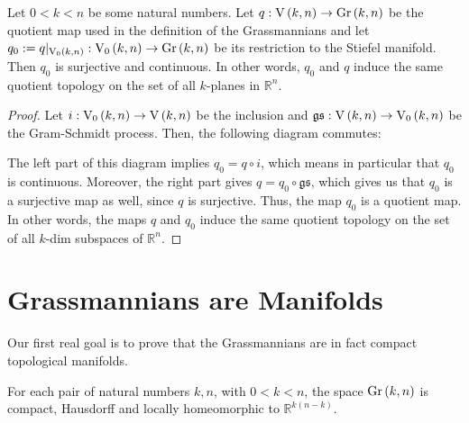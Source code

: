 \begin{proposition} Let $0<k<n$ be some natural numbers. Let $q:\St{k}{n}\to\Gr{k}{n}$ be the quotient map used in the definition of the Grassmannians and let $q_0:=q|_{\StO{k}{n}}:\StO{k}{n}\to\Gr{k}{n}$ be its restriction to the Stiefel manifold. Then $q_0$ is surjective and continuous. In other words, $q_0$ and $q$ induce the same quotient topology on the set of all $k$-planes in $\mathbb{R}^n$.
\end{proposition}
\begin{proof}
Let $i:\StO{k}{n}\to\St{k}{n}$ be the inclusion and $\mathfrak{gs}:\St{k}{n}\to\StO{k}{n}$ be the Gram-Schmidt process. Then, the following diagram commutes:
\begin{center}
\end{center}
The left part of this diagram implies $q_0=q\circ i$, which means in particular that $q_0$ is continuous. Moreover, the right part gives $q=q_0\circ\mathfrak{gs}$, which gives us that $q_0$ is a surjective map as well, since $q$ is surjective. Thus, the map $q_0$ is a quotient map. In other words, the maps $q$ and $q_0$ induce the same quotient topology on the set of all $k$-dim subspaces of $\mathbb{R}^n$.
\end{proof}

\section{Grassmannians are Manifolds}
Our first real goal is to prove that the Grassmannians are in fact compact topological manifolds.
\begin{lemma} For each pair of natural numbers $k,n$, with $0<k<n$, the space $\Gr{k}{n}$ is compact, Hausdorff and locally homeomorphic to $\mathbb{R}^{k(n-k)}$. 
\end{lemma}

